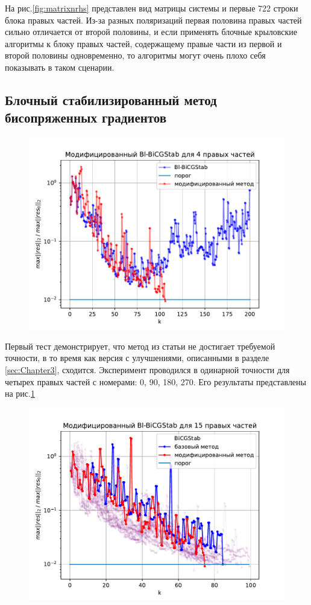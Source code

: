 На рис.\ref{fig:matrixnrhs} представлен вид матрицы системы и первые 722 строки блока
правых частей. Из-за разных поляризаций первая половина правых частей сильно отличается от второй половины, и 
если применять блочные крыловские алгоритмы к блоку правых частей, содержащему правые части из первой и второй половины
одновременно, то алгоритмы могут очень плохо себя показывать в таком сценарии.

\subsection{Блочный стабилизированный метод бисопряженных градиентов}

\begin{figure}[H]
    \centering
    \includegraphics[width=0.7\linewidth]{images/4.pdf}
    \caption{}
    \label{fig:4}
\end{figure} 
\par Первый тест демонстрирует, что метод из статьи \cite{elGuennouni2003} не достигает требуемой точности, в то время как 
версия с улучшениями, описанными в разделе \ref{sec:Chapter3}, сходится. 
Эксперимент проводился в одинарной точности для четырех правых частей с номерами: 0, 90, 180, 270. Его результаты представлены
на рис.\ref{fig:4}
\begin{figure}[H]
    \centering
    \includegraphics[width=0.7\linewidth]{images/acceleration_15_rhs.pdf}
    \caption{}
    \label{fig:acceleration_15}
\end{figure}
